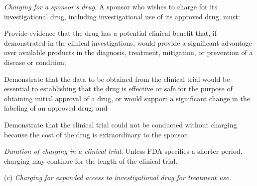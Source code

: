 \documentclass[11pt]{article}
\begin{document}
\begin{description}[leftmargin=0.5cm,style=sameline]
\item[(1)] \textit{Charging for a sponsor's drug.} A sponsor who wishes to charge for its investigational drug, including investigational use of its approved drug, must:
\begin{description}[leftmargin=0.8cm,style=sameline]
\item[(i)] Provide evidence that the drug has a potential clinical benefit that, if demonstrated in the clinical investigations, would provide a significant advantage over available products in the diagnosis, treatment, mitigation, or prevention of a disease or condition;
\item[(ii)] Demonstrate that the data to be obtained from the clinical trial would be essential to establishing that the drug is effective or safe for the purpose of obtaining initial approval of a drug, or would support a significant change in the labeling of an approved drug; and
\item[(iii)] Demonstrate that the clinical trial could not be conducted without charging because the cost of the drug is extraordinary to the sponsor.
\end{description}
\item[(2)] \textit{Duration of charging in a clinical trial.} Unless FDA specifies a shorter period, charging may continue for the length of the clinical trial.
\end{description}

(c) \textit{Charging for expanded access to investigational drug for treatment use.}
\end{document}
